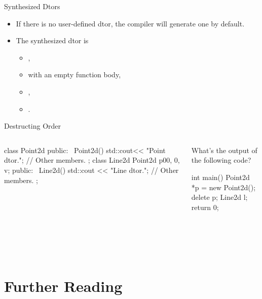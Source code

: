 \documentclass{beamer}
\begin{document}
\begin{frame}{Synthesized Dtors}
    \begin{itemize}
        \item If there is no user-defined dtor, the compiler will generate one by default.
        \item The synthesized dtor is
        \begin{itemize}
            \item {},
            \item with an empty function body,
            \item {},
            \item {}.
        \end{itemize}
    \end{itemize}
\end{frame}

\begin{frame}[fragile]{Destructing Order}
    \begin{columns}
        \begin{column}{0.5\linewidth}
            \begin{cpp}
class Point2d {
 public:
  ~Point2d() {
    std::cout<< "Point dtor.\n";
  }
  // Other members.
};
class Line2d {
  Point2d p0{0, 0}, v; 
 public:
  ~Line2d() {
    std::cout << "Line dtor.\n";
  }
  // Other members.
};
            \end{cpp}
        \end{column}
        \begin{column}{0.5\linewidth}
            What's the output of the following code?
            \begin{cpp}
int main() {
  Point2d *p = new Point2d();
  delete p;
  Line2d l;
  return 0;
}
            \end{cpp}
            \pause
            \\
            \\
            \\
        \end{column}
    \end{columns}
\end{frame}

\section{Further Reading}
\end{document}
